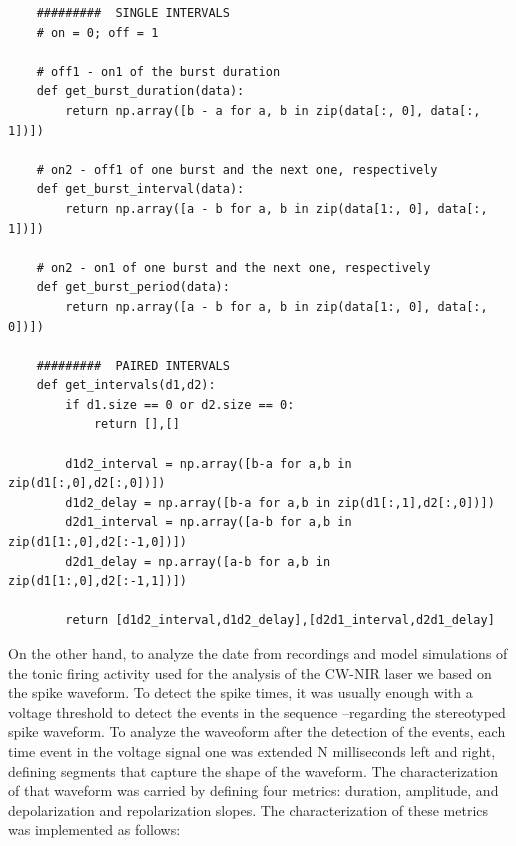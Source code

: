 
\begin{lstlisting}
	#########  SINGLE INTERVALS
	# on = 0; off = 1
	
	# off1 - on1 of the burst duration
	def get_burst_duration(data):
		return np.array([b - a for a, b in zip(data[:, 0], data[:, 1])])
	
	# on2 - off1 of one burst and the next one, respectively
	def get_burst_interval(data):
		return np.array([a - b for a, b in zip(data[1:, 0], data[:, 1])])
		
	# on2 - on1 of one burst and the next one, respectively
	def get_burst_period(data):
		return np.array([a - b for a, b in zip(data[1:, 0], data[:, 0])])
		
	#########  PAIRED INTERVALS
	def get_intervals(d1,d2):
		if d1.size == 0 or d2.size == 0:
			return [],[]
			
		d1d2_interval = np.array([b-a for a,b in zip(d1[:,0],d2[:,0])])
		d1d2_delay = np.array([b-a for a,b in zip(d1[:,1],d2[:,0])])
		d2d1_interval = np.array([a-b for a,b in zip(d1[1:,0],d2[:-1,0])])
		d2d1_delay = np.array([a-b for a,b in zip(d1[1:,0],d2[:-1,1])])
	
		return [d1d2_interval,d1d2_delay],[d2d1_interval,d2d1_delay]
\end{lstlisting}

On the other hand, to analyze the date from recordings and model simulations of the tonic firing activity used for the analysis of the CW-NIR laser we based on the spike waveform. To detect the spike times, it was usually enough with a voltage threshold to detect the events in the sequence --regarding the stereotyped spike waveform. To analyze the waveoform after the detection of the events, each time event in the voltage signal one was extended N milliseconds left and right, defining segments that capture the shape of the waveform. The characterization of that waveform was carried by defining four metrics: duration, amplitude, and depolarization and repolarization slopes. The characterization of these metrics was implemented as follows:

